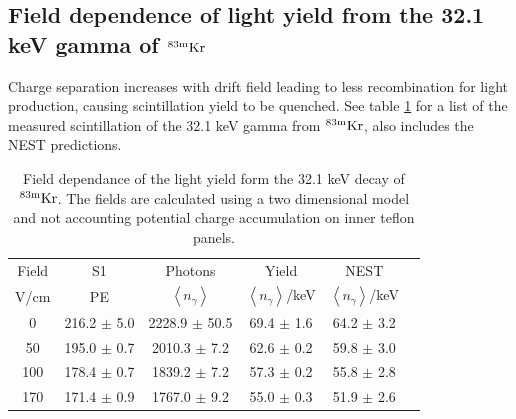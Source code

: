\subsection{Field dependence of light yield from the 32.1 keV gamma of $\rm ^{83m}Kr$ }

Charge separation increases with drift field leading to less recombination for light production, causing scintillation yield to be quenched. See table \ref{table:kr32} for a list of the measured scintillation of the 32.1 keV gamma from $\rm ^{83m}Kr$, also includes the NEST predictions.

\renewcommand{\baselinestretch}{1}
\small\normalsize
\begin{table}[h!]
\begin{center}
\begin{tabular}{|c|c|c|c|c|c|}
\hline
Field	&S1			& Photons						& Yield 								&NEST	 \\
V/cm	& PE					& $\left<n_{\gamma}\right>$		& $\left<n_{\gamma}\right>$/keV	& $\left<n_{\gamma}\right>$/keV \\ \hline
0 		&	216.2 $\pm$ 5.0 	&2228.9 $\pm$ 50.5 &	69.4 $\pm$	1.6 	&	64.2 $\pm$ 3.2  \\ \hline
50 		&	195.0 $\pm$ 0.7 	&2010.3 $\pm$ 7.2   & 	62.6 $\pm$	0.2	&	59.8 $\pm$ 3.0 \\ \hline
100 	&	178.4 $\pm$ 0.7 	&1839.2 $\pm$ 	7.2	 &	57.3 $\pm$ 0.2 	&	55.8 $\pm$ 2.8 \\ \hline
170 	&  171.4 $\pm$ 0.9		&1767.0 $\pm$ 	9.2  &	55.0 $\pm$ 0.3 	&	51.9 $\pm$ 2.6 \\ \hline
\end{tabular}
\caption{Field dependance of the light yield form the 32.1 keV decay of $\rm^{83m}Kr$. The fields are calculated using a two dimensional model and not accounting potential charge accumulation on inner teflon panels.}
\label{table:kr32}
\end{center}
\end{table}
\renewcommand{\baselinestretch}{2}
\small\normalsize



